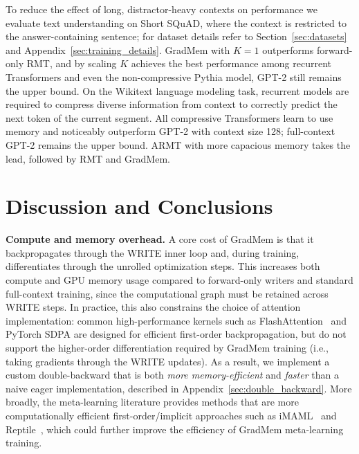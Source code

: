 \documentclass{article}
\theoremstyle{plain}
\theoremstyle{definition}
\theoremstyle{remark}
\begin{document}
{To reduce the effect of long, distractor-heavy contexts on performance we evaluate text understanding on Short SQuAD, where the context is restricted to the answer-containing sentence; for dataset details refer to Section~\ref{sec:datasets} and Appendix~\ref{sec:training_details}. GradMem with $K=1$ outperforms forward-only RMT, and by scaling $K$ achieves the best performance among recurrent Transformers and even the non-compressive Pythia model, GPT-2 still remains the upper bound. On the Wikitext language modeling task, recurrent models are required to compress diverse information from context to correctly predict the next token of the current segment. All compressive Transformers learn to use memory and noticeably outperform GPT-2 with context size 128; full-context GPT-2 remains the upper bound. ARMT with more capacious memory takes the lead, followed by RMT and GradMem.%


\section{Discussion and Conclusions}

\textbf{Compute and memory overhead.}
A core cost of GradMem is that it backpropagates through the WRITE inner loop and, during training, differentiates through the unrolled optimization steps.
This increases both compute and GPU memory usage compared to forward-only writers and standard full-context training, since the computational graph must be retained across WRITE steps.
In practice, this also constrains the choice of attention implementation: common high-performance kernels such as FlashAttention~\citep{flashattention} and PyTorch SDPA are designed for efficient first-order backpropagation, but do not support the higher-order differentiation required by GradMem training (i.e., taking gradients through the WRITE updates).
As a result, we implement a custom double-backward that is both \emph{more memory-efficient} and \emph{faster} than a naive eager implementation, described in Appendix~\ref{sec:double_backward}.
More broadly, the meta-learning literature provides methods that are more computationally efficient first-order/implicit approaches such as iMAML~\citep{imaml} and Reptile~\citep{nichol2018reptile}, which could further improve the efficiency of GradMem meta-learning training.

}
\end{document}
